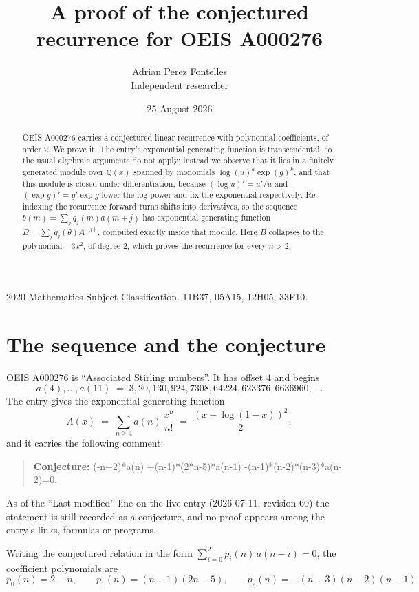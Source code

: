 \documentclass[11pt,a4paper]{article}
\title{A proof of the conjectured recurrence for OEIS A000276}
\author{Adrian Perez Fontelles\\ \small Independent researcher}
\date{25 August 2026}
\theoremstyle{plain}
\theoremstyle{definition}
\begin{document}
\maketitle

\begin{abstract}
OEIS A000276 carries a conjectured linear recurrence with polynomial coefficients, of
order 2. We prove it. The entry's exponential generating function is
transcendental, so the usual algebraic arguments do not apply; instead we observe that it
lies in a finitely generated module over $\mathbb{Q}(x)$ spanned by monomials
$\log(u)^{a}\exp(g)^{k}$, and that this module is closed under differentiation, because
$(\log u)'=u'/u$ and $(\exp g)'=g'\exp g$ lower the log power and fix the exponential
respectively. Re-indexing the recurrence forward turns shifts into derivatives, so the
sequence $b(m)=\sum_{j}q_{j}(m)a(m+j)$ has exponential generating function
$B=\sum_{j}q_{j}(\theta)A^{(j)}$, computed exactly inside that module. Here $B$ collapses
to the polynomial $- 3 x^{2}$, of degree $2$, which proves the recurrence for every
$n>2$.
\end{abstract}

\noindent\small 2020 Mathematics Subject Classification. 11B37, 05A15, 12H05, 33F10.\normalsize

\section{The sequence and the conjecture}

OEIS A000276 is ``Associated Stirling numbers''. It has offset $4$ and begins
\[
a(4),\dots,a(11)\;=\;3, 20, 130, 924, 7308, 64224, 623376, 6636960,\ \dots
\]
The entry gives the exponential generating function
\begin{equation}\label{eq:gf}
A(x)\;=\;\sum_{n\ge 4} a(n)\,\frac{x^{n}}{n!}\;=\;\frac{\left(x + \log{\left(1 - x \right)}\right)^{2}}{2} ,
\end{equation}
and it carries the following comment:
\begin{quote}\small
\textbf{Conjecture:} (-n+2)*a(n) +(n-1)*(2*n-5)*a(n-1) -(n-1)*(n-2)*(n-3)*a(n-2)=0.
\end{quote}
As of the ``Last modified'' line on the live entry (2026-07-11, revision 60) the
statement is still recorded as a conjecture, and no proof appears among the entry's links,
formulas or programs.

Writing the conjectured relation in the form $\sum_{i=0}^{2}p_{i}(n)\,a(n-i)=0$,
the coefficient polynomials are
\[
p_{0}(n)=2 - n,\qquad p_{1}(n)=\left(n - 1\right) \left(2 n - 5\right),\qquad p_{2}(n)=- \left(n - 3\right) \left(n - 2\right) \left(n - 1\right)
\]
\end{document}

